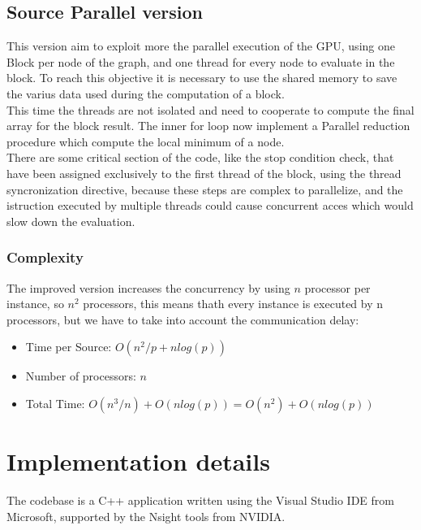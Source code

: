 \documentclass[
	a4paper, %
	12pt, %
]{class}
\begin{document}
\subsection{Source Parallel version}
This version aim to exploit more the parallel execution of the GPU, using one Block per node of the graph, and one thread for every node to evaluate in the block.
To reach this objective it is necessary to use the shared memory to save the varius data used during the computation of a block.\\

This time the threads are not isolated and need to cooperate to compute the final array for the block result.
The inner for loop now implement a Parallel reduction procedure which compute the local minimum of a node.\\

There are some critical section of the code, like the stop condition check, that have been assigned exclusively to the first thread of the block,
using the thread syncronization directive, because these steps are complex to parallelize, and the istruction executed by multiple threads could
cause concurrent acces which would slow down the evaluation.

\subsubsection{Complexity}
The improved version increases the concurrency by using $n$ processor per instance, so $n^2$ processors, this means thath every instance is executed
by n processors, but we have to take into account the communication delay:\\
\begin{itemize}
    \item Time per Source: $O(n^2/p + nlog(p))$
    \item Number of processors: $n$
    \item Total Time: $O(n^3 / n) + O(nlog(p)) = O(n^2) + O(nlog(p))$\\
\end{itemize}

\newpage
\section{Implementation details}

The codebase is a C++ application written using the Visual Studio IDE from Microsoft, supported by the Nsight tools from NVIDIA. \cite{nsight}
\end{document}
